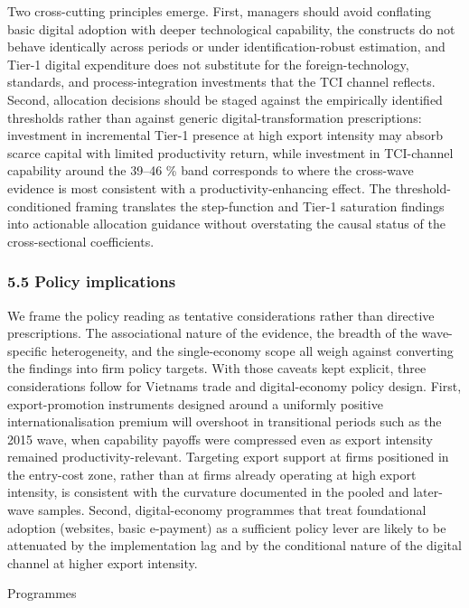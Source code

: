 \documentclass[12pt,a4paper]{article}
\begin{document}
Two cross-cutting principles emerge. First, managers should avoid
conflating basic digital adoption with deeper technological capability,
the constructs do not behave identically across periods or under
identification-robust estimation, and Tier-1 digital expenditure does
not substitute for the foreign-technology, standards, and
process-integration investments that the TCI channel reflects. Second,
allocation decisions should be staged against the empirically identified
thresholds rather than against generic digital-transformation
prescriptions: investment in incremental Tier-1 presence at high export
intensity may absorb scarce capital with limited productivity return,
while investment in TCI-channel capability around the 39--46 \% band
corresponds to where the cross-wave evidence is most consistent with a
productivity-enhancing effect. The threshold-conditioned framing
translates the step-function and Tier-1 saturation findings into
actionable allocation guidance without overstating the causal status of
the cross-sectional coefficients.

\hypertarget{55-policy-implications}{%
\subsubsection{5.5 Policy implications}\label{55-policy-implications}}

We frame the policy reading as tentative considerations rather than
directive prescriptions. The associational nature of the evidence, the
breadth of the wave-specific heterogeneity, and the single-economy scope
all weigh against converting the findings into firm policy targets. With
those caveats kept explicit, three considerations follow for
Vietnam\textquotesingle s trade and digital-economy policy design.
First, export-promotion instruments designed around a uniformly positive
internationalisation premium will overshoot in transitional periods such
as the 2015 wave, when capability payoffs were compressed even as export
intensity remained productivity-relevant. Targeting export support at
firms positioned in the entry-cost zone, rather than at firms already
operating at high export intensity, is consistent with the curvature
documented in the pooled and later-wave samples. Second, digital-economy
programmes that treat foundational adoption (websites, basic e-payment)
as a sufficient policy lever are likely to be attenuated by the
implementation lag and by the conditional nature of the digital channel
at higher export intensity.

Programmes
\end{document}
